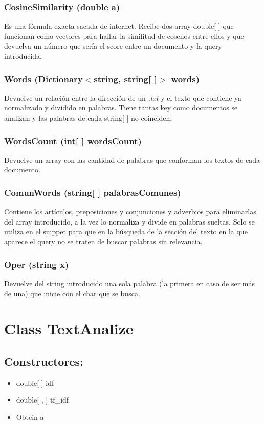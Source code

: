 \documentclass[a4paper,12pt,]{article}
\begin{document}
\subsubsection*{CosineSimilarity (double a)}
Es una fórmula exacta sacada de internet.
Recibe dos array double[ ] que funcionan como vectores para hallar la similitud de cosenos entre ellos y que 
devuelva un número que sería el score entre un documento y la query introducida.

\subsubsection*{Words (Dictionary$<$string, string[ ]$>$ words)}
Devuelve un relación entre la dirección de un \textit{.txt} y el texto que contiene ya normalizado y dividido 
en palabras. Tiene tantas key como documentos se analizan y las palabras de cada string[ ] no coinciden.

\subsubsection*{WordsCount (int[ ] wordsCount)}
Devuelve un array con las cantidad de palabras que conforman los textos de cada documento.

\subsubsection*{ComunWords (string[ ] palabrasComunes)}
Contiene los artículos, preposiciones y conjunciones y adverbios para eliminarlas del array introducido, a la 
vez lo normaliza y divide en palabras sueltas.
Solo se utiliza en el snippet para que en la búsqueda de la sección del texto en la que aparece el query no se 
traten de buscar palabras sin relevancia.

\subsubsection*{Oper (string x)}
Devuelve del string introducido una sola palabra (la primera en caso de ser más de una) que inicie con el char 
que se busca.

\section*{Class TextAnalize}

\subsection*{Constructores:}
\begin{itemize}
    \item double[ ] idf
    \item double[ , ] tf\_idf
    \item Obtein a
\end{itemize}
\end{document}
